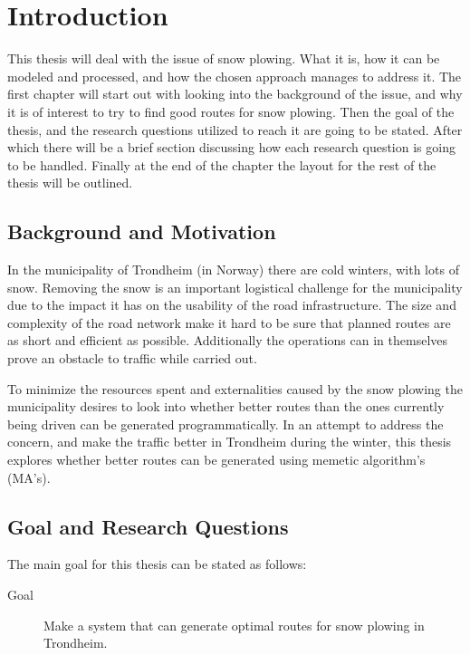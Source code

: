 \chapter{Introduction}
\label{cha:introduction}

This thesis will deal with the issue of snow plowing. What it is, how it can be modeled and processed, and how the chosen approach manages to address it. The first chapter will start out with looking into the background of the issue, and why it is of interest to try to find good routes for snow plowing. Then the goal of the thesis, and the research questions utilized to reach it are going to be stated. After which there will be a brief section discussing how each research question is going to be handled. Finally at the end of the chapter the layout for the rest of the thesis will be outlined.

\section{Background and Motivation}

In the municipality of Trondheim (in Norway) there are cold winters, with lots of snow. Removing the snow is an important logistical challenge for the municipality due to the impact it has on the usability of the road infrastructure. The size and complexity of the road network make it hard to be sure that planned routes are as short and efficient as possible. Additionally the operations can in themselves prove an obstacle to traffic while carried out.

To minimize the resources spent and externalities caused by the snow plowing the municipality desires to look into whether better routes than the ones currently being driven can be generated programmatically. In an attempt to address the concern, and make the traffic better in Trondheim during the winter, this thesis explores whether better routes can be generated using memetic algorithm's (MA's).

\section{Goal and Research Questions}
\label{sec:goal_and_research_questions}

The main goal for this thesis can be stated as follows:

\begin{description}
    \item [Goal] Make a system that can generate optimal routes for snow plowing in Trondheim.
\end{description}

